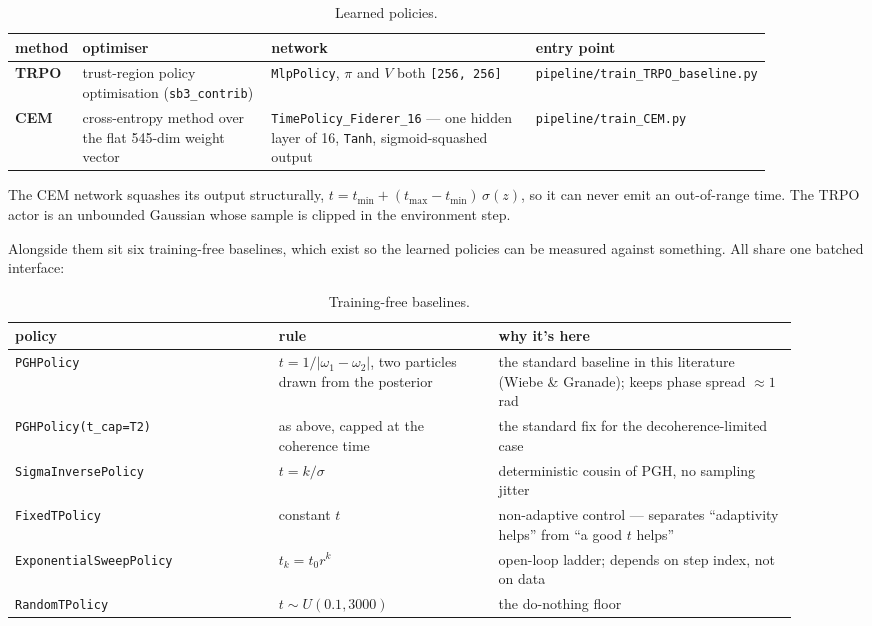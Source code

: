 \documentclass[12pt,a4paper]{article}
\begin{document}
\begin{table}[H]
  \centering
  \caption{Learned policies.}
  \label{tab:learned-policies}
  \footnotesize
  \begin{tabular}{>{\raggedright\arraybackslash}p{0.062\linewidth}>{\raggedright\arraybackslash}p{0.257\linewidth}>{\raggedright\arraybackslash}p{0.357\linewidth}>{\raggedright\arraybackslash}p{0.205\linewidth}}
  \toprule
  method & optimiser & network & entry point \\
  \midrule
  \textbf{TRPO} & trust-region policy optimisation (\texttt{sb3\_\allowbreak{}contrib}) & \texttt{MlpPolicy}, $\pi$ and $V$ both \texttt{[256, 256]} & \texttt{pipeline/\allowbreak{}train\_\allowbreak{}TRPO\_\allowbreak{}baseline.\allowbreak{}py} \\
  \textbf{CEM} & cross-entropy method over the flat 545-dim weight vector & \texttt{TimePolicy\_\allowbreak{}Fiderer\_\allowbreak{}16} --- one hidden layer of 16, \texttt{Tanh}, sigmoid-squashed output & \texttt{pipeline/\allowbreak{}train\_\allowbreak{}CEM.\allowbreak{}py} \\
  \bottomrule
  \end{tabular}
\end{table}
The CEM network squashes its output structurally, $t = t_{\min} + (t_{\max}-t_{\min})\,\sigma(z)$, so it can never emit an out-of-range time. The TRPO actor is an unbounded Gaussian whose sample is clipped in the environment step.

Alongside them sit six training-free baselines, which exist so the learned policies can be measured against something. All share one batched interface:

\begin{table}[H]
  \centering
  \caption{Training-free baselines.}
  \label{tab:training-free-baselines}
  \footnotesize
  \begin{tabular}{>{\raggedright\arraybackslash}p{0.307\linewidth}>{\raggedright\arraybackslash}p{0.254\linewidth}>{\raggedright\arraybackslash}p{0.345\linewidth}}
  \toprule
  policy & rule & why it's here \\
  \midrule
  \texttt{PGHPolicy} & $t = 1/\lvert\omega_1 - \omega_2\rvert$, two particles drawn from the posterior & the standard baseline in this literature (Wiebe \& Granade); keeps phase spread $\approx 1$ rad \\
  \texttt{PGHPolicy(t\_\allowbreak{}cap=T2)} & as above, capped at the coherence time & the standard fix for the decoherence-limited case \\
  \texttt{SigmaInversePolicy} & $t = k/\sigma$ & deterministic cousin of PGH, no sampling jitter \\
  \texttt{FixedTPolicy} & constant $t$ & non-adaptive control --- separates ``adaptivity helps'' from ``a good $t$ helps'' \\
  \texttt{ExponentialSweepPolicy} & $t_k = t_0 r^k$ & open-loop ladder; depends on step index, not on data \\
  \texttt{RandomTPolicy} & $t \sim U(0.1, 3000)$ & the do-nothing floor \\
  \bottomrule
  \end{tabular}
\end{table}
\end{document}

